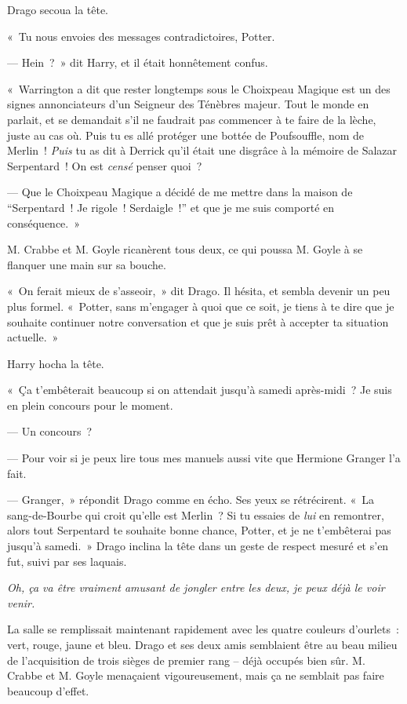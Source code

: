 Drago secoua la tête.

«~Tu nous envoies des messages contradictoires, Potter.

--- Hein~?~» dit Harry, et il était honnêtement confus.

«~Warrington a dit que rester longtemps sous le Choixpeau Magique est un des signes annonciateurs d'un Seigneur des Ténèbres majeur. Tout le monde en parlait, et se demandait s'il ne faudrait pas commencer à te faire de la lèche, juste au cas où. Puis tu es allé protéger une bottée de Poufsouffle, nom de Merlin~! \emph{Puis} tu as dit à Derrick qu'il était une disgrâce à la mémoire de Salazar Serpentard~! On est \emph{censé} penser quoi~?

--- Que le Choixpeau Magique a décidé de me mettre dans la maison de “Serpentard~! Je rigole~! Serdaigle~!” et que je me suis comporté en conséquence.~»

M. Crabbe et M. Goyle ricanèrent tous deux, ce qui poussa M. Goyle à se flanquer une main sur sa bouche.

«~On ferait mieux de s'asseoir,~» dit Drago. Il hésita, et sembla devenir un peu plus formel. «~Potter, sans m'engager à quoi que ce soit, je tiens à te dire que je souhaite continuer notre conversation et que je suis prêt à accepter ta situation actuelle.~»

Harry hocha la tête.

«~Ça t'embêterait beaucoup si on attendait jusqu'à samedi après-midi~? Je suis en plein concours pour le moment.

--- Un concours~?

--- Pour voir si je peux lire tous mes manuels aussi vite que Hermione Granger l'a fait.

--- Granger,~» répondit Drago comme en écho. Ses yeux se rétrécirent. «~La sang-de-Bourbe qui croit qu'elle est Merlin~? Si tu essaies de \emph{lui} en remontrer, alors tout Serpentard te souhaite bonne chance, Potter, et je ne t'embêterai pas jusqu'à samedi.~» Drago inclina la tête dans un geste de respect mesuré et s'en fut, suivi par ses laquais.

\emph{Oh, ça va être vraiment amusant de jongler entre les deux, je peux déjà le voir venir.}

La salle se remplissait maintenant rapidement avec les quatre couleurs d'ourlets~: vert, rouge, jaune et bleu. Drago et ses deux amis semblaient être au beau milieu de l'acquisition de trois sièges de premier rang -- déjà occupés bien sûr. M. Crabbe et M. Goyle menaçaient vigoureusement, mais ça ne semblait pas faire beaucoup d'effet.

